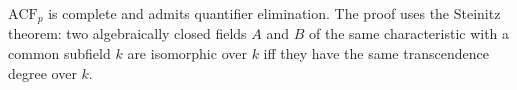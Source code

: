 $\mathrm{ACF}_p$ is complete and admits quantifier elimination. The proof uses the Steinitz theorem: two algebraically closed fields $A$ and $B$ of the same characteristic with a common subfield $k$ are isomorphic over $k$ iff they have the same transcendence degree over $k$.
